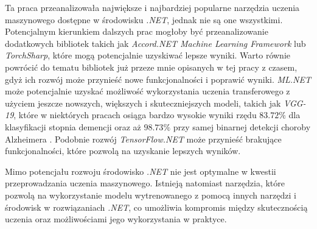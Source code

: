 Ta praca przeanalizowała największe i najbardziej popularne narzędzia uczenia maszynowego dostępne w środowisku \emph{.NET}, jednak nie są one wszystkimi.
Potencjalnym kierunkiem dalszych prac mogłoby być przeanalizowanie dodatkowych bibliotek takich jak \emph{Accord.NET Machine Learning Framework} lub \emph{TorchSharp}, które mogą potencjalnie uzyskiwać lepsze wyniki.
Warto równie powrócić do tematu bibliotek już przeze mnie opisanych w tej pracy z czasem, gdyż ich rozwój może przynieść nowe funkcjonalności i poprawić wyniki.
\emph{ML.NET} może potencjalnie uzyskać możliwość wykorzystania uczenia transferowego z użyciem jeszcze nowszych, większych i skuteczniejszych modeli, takich jak \emph{VGG-19}, które w niektórych pracach osiąga bardzo wysokie wyniki
rzędu $83.72\%$ dla klasyfikacji stopnia demencji oraz aż $98.73\%$ przy samej binarnej detekcji choroby Alzheimera \cite{mehmood2021transfer}.
Podobnie rozwój \emph{TensorFlow.NET} może przynieść brakujące funkcjonalności, które pozwolą na uzyskanie lepszych wyników.

Mimo potencjału rozwoju środowisko \emph{.NET} nie jest optymalne w kwestii przeprowadzania uczenia maszynowego.
Istnieją natomiast narzędzia, które pozwolą na wykorzystanie modelu wytrenowanego z pomocą innych narzędzi i środowisk w rozwiązaniach \emph{.NET}, co umożliwia kompromis między skutecznością uczenia oraz możliwościami jego wykorzystania w praktyce.
